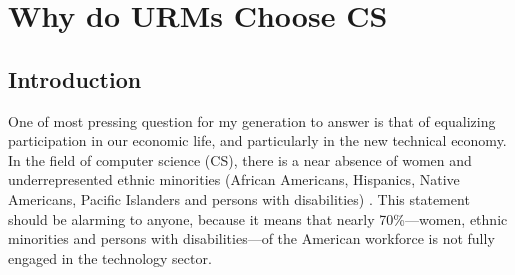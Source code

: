 \documentclass[oneside,titlepage,numbers=noenddot,headinclude,%
               footinclude=true,cleardoublepage=empty,abstractoff,BCOR=2mm,%
               paper=a4,fontsize=11pt,ngerman,american]{scrreprt}
\numberwithin{theorem}{chapter}
\numberwithin{definition}{chapter}
\numberwithin{algorithm}{chapter}
\numberwithin{figure}{chapter}
\numberwithin{table}{chapter}
\numberwithin{equation}{chapter}
\begin{document}
\frenchspacing
\raggedbottom
{}
\pagestyle{plain}





\cleardoublepage

\chapter*{Why do URMs Choose CS}

\section*{Introduction}

One of most pressing question for my generation to answer is that of equalizing participation in our economic life, and particularly in the new technical economy. In the field of computer science (CS), there is a near absence of women and underrepresented ethnic minorities (African Americans, Hispanics, Native Americans, Pacific Islanders and persons with disabilities) \citep{Trauth:2012:UUT:2132176.2132184,Gurer2002,Zweben2010,Foundation:2013qy}. This statement should be alarming to anyone, because it means that nearly 70\%---women, ethnic minorities and persons with disabilities---of the American workforce is not fully engaged in the technology sector. 
\end{document}
